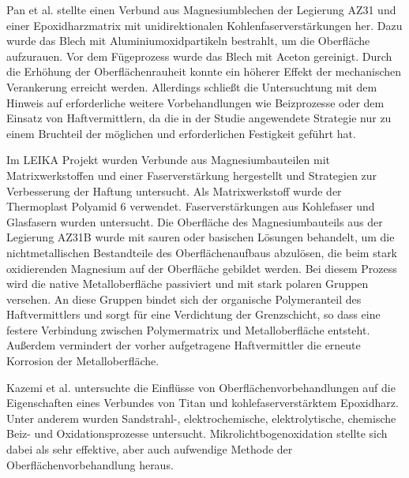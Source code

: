 Pan et al. \cite{Pan.2016} stellte einen Verbund aus Magnesiumblechen der Legierung AZ31 und einer Epoxidharzmatrix mit unidirektionalen Kohlenfaserverstärkungen her.
Dazu wurde das Blech mit Aluminiumoxidpartikeln bestrahlt, um die Oberfläche aufzurauen.
Vor dem Fügeprozess wurde das Blech mit Aceton gereinigt.
Durch die Erhöhung der Oberflächenrauheit konnte ein höherer Effekt der mechanischen Verankerung erreicht werden.
Allerdings schließt die Untersuchtung mit dem Hinweis auf erforderliche weitere Vorbehandlungen wie Beizprozesse oder dem Einsatz von Haftvermittlern, da die in der Studie angewendete Strategie nur zu einem Bruchteil der möglichen und erforderlichen Festigkeit geführt hat.

Im LEIKA Projekt \cite{LEIKA.2017} wurden Verbunde aus Magnesiumbauteilen mit Matrixwerkstoffen und einer Faserverstärkung hergestellt und Strategien zur Verbesserung der Haftung untersucht.
Als Matrixwerkstoff wurde der Thermoplast Polyamid 6 verwendet.
Faserverstärkungen aus Kohlefaser und Glasfasern wurden untersucht.
Die Oberfläche des Magnesiumbauteils aus der Legierung AZ31B wurde mit sauren oder basischen Lösungen behandelt, um die nichtmetallischen Bestandteile des Oberflächenaufbaus abzulösen, die beim stark oxidierenden Magnesium auf der Oberfläche gebildet werden.
Bei diesem Prozess wird die native Metalloberfläche passiviert und mit stark polaren Gruppen versehen.
An diese Gruppen bindet sich der organische Polymeranteil des Haftvermittlers und sorgt für eine Verdichtung der Grenzschicht, so dass eine festere Verbindung zwischen Polymermatrix und Metalloberfläche entsteht.
Außerdem vermindert der vorher aufgetragene Haftvermittler die erneute Korrosion der Metalloberfläche.

Kazemi et al. \cite{Kazemi.2020} untersuchte die Einflüsse von Oberflächenvorbehandlungen auf die Eigenschaften eines Verbundes von Titan und kohlefaserverstärktem Epoxidharz.
Unter anderem wurden Sandstrahl-, elektrochemische, elektrolytische, chemische Beiz- und Oxidationsprozesse untersucht.
Mikrolichtbogenoxidation stellte sich dabei als sehr effektive, aber auch aufwendige Methode der Oberflächenvorbehandlung heraus.

